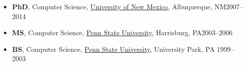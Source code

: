\documentclass[11pt]{article}
\begin{document}
\begin{itemize}


\item \textbf{PhD}, Computer Science,  \href{https://www.unm.edu}{University of New Mexico}, Albuquerque, NM\hfill 2007--2014
  
\item \textbf{MS}, Computer Science,  \href{https://www.hbg.psu.edu}{Penn State University}, Harrisburg, PA\hfill 2003--2006
  
\item \textbf{BS}, Computer Science, \href{https://www.psu.edu}{Penn State University}, University Park, PA \hfill 1999--2003


  
\end{itemize}
\end{document}
